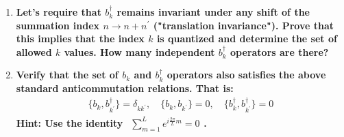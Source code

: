 \documentclass[../../main.tex]{subfiles}
\begin{document}
\begin{enumerate}
  \item \textbf{Let's require that $b^{\dagger}_{k}$ remains invariant under any shift of the summation index $n\rightarrow n + n^{\prime}$ ("translation invariance"). Prove that this implies that the index $k$ is quantized and determine the set of allowed $k$ values. How many independent $b^{\dagger}_{k}$ operators are there?} 
  
  {}
  
  \item \textbf{Verify that the set of $b_{k}$ and $b^{\dagger}_{k}$ operators also satisfies the above standard anticommutation relations. That is:
  \begin{align*}
    \{b_{k},b_{k^{\prime}}^{\dagger}\} = \delta_{kk^{\prime}},\quad \{b_{k},b_{k^{\prime}}\} = 0,\quad \{b_{k}^{\dagger},b_{k^{\prime}}^{\dagger}\} = 0
  \end{align*}
  Hint: Use the identity $\begin{aligned}
    \sum_{m=1}^{L} e^{i\frac{2\pi}{L}m}= 0
  \end{aligned}$.}


\end{enumerate}
\end{document}
